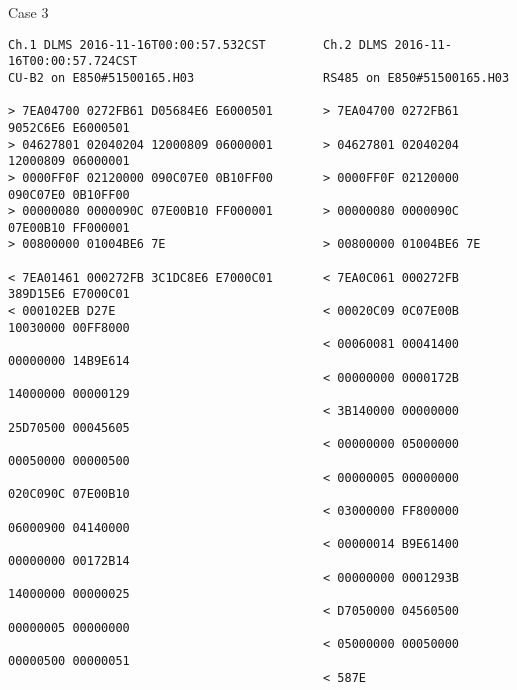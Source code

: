 \documentclass[11pt,a4paper]{article}
\begin{document}
\newpage
\large{Case 3}
\lstset{escapechar=@,style=datagram}
\begin{lstlisting}
Ch.1 DLMS 2016-11-16T00:00:57.532CST        Ch.2 DLMS 2016-11-16T00:00:57.724CST
CU-B2 on E850#51500165.H03                  RS485 on E850#51500165.H03
                                            
> 7EA04700 0272FB61 D05684E6 E6000501       > 7EA04700 0272FB61 9052C6E6 E6000501
> 04627801 02040204 12000809 06000001       > 04627801 02040204 12000809 06000001
> 0000FF0F 02120000 090C07E0 0B10FF00       > 0000FF0F 02120000 090C07E0 0B10FF00
> 00000080 0000090C 07E00B10 FF000001       > 00000080 0000090C 07E00B10 FF000001
> 00800000 01004BE6 7E                      > 00800000 01004BE6 7E               
                                            
< 7EA01461 000272FB 3C1DC8E6 E7000C01       < 7EA0C061 000272FB 389D15E6 E7000C01
< 000102EB D27E                             < 00020C09 0C07E00B 10030000 00FF8000
                                            < 00060081 00041400 00000000 14B9E614
                                            < 00000000 0000172B 14000000 00000129
                                            < 3B140000 00000000 25D70500 00045605
                                            < 00000000 05000000 00050000 00000500
                                            < 00000005 00000000 020C090C 07E00B10
                                            < 03000000 FF800000 06000900 04140000
                                            < 00000014 B9E61400 00000000 00172B14
                                            < 00000000 0001293B 14000000 00000025
                                            < D7050000 04560500 00000005 00000000
                                            < 05000000 00050000 00000500 00000051
                                            < 587E                               
\end{lstlisting}
\end{document}
